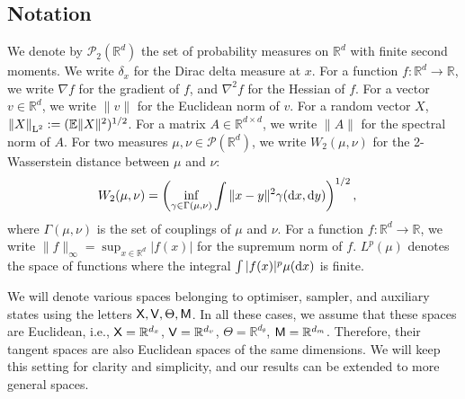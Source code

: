 \subsection{Notation}
We denote by $\mathcal{P}_2(\mathbb{R}^d)$ the set of probability measures on $\mathbb{R}^d$ with finite second moments.
We write $\delta_x$ for the Dirac delta measure at $x$. For a function $f:\mathbb{R}^d\rightarrow\mathbb{R}$, we write $\nabla f$ for the gradient of $f$, and $\nabla^2 f$ for the Hessian of $f$. For a vector $v\in\mathbb{R}^d$, we write $\|v\|$ for the Euclidean norm of $v$. For a random vector $X$, $\mathopen{\lVert}X\mathclose{\rVert}_{\mathrm{L}^2}:=(\mathbb{E}\|X\|^2)^{1/2}$. For a matrix $A\in\mathbb{R}^{d\times d}$, we write $\|A\|$ for the spectral norm of $A$. For two measures $\mu,\nu\in\mathcal{P}(\mathbb{R}^d)$, we write $W_2(\mu,\nu)$ for the 2-Wasserstein distance between $\mu$ and $\nu$:
\begin{align*}
    W_2(\mu,\nu) &= \left(\inf_{\gamma\in\Gamma(\mu,\nu)}\int \|x-y\|^2 \gamma(\mathrm{d} x,\mathrm{d} y)\right)^{1/2},
\end{align*}
where $\Gamma(\mu,\nu)$ is the set of couplings of $\mu$ and $\nu$. For a function $f:\mathbb{R}^d\rightarrow\mathbb{R}$, we write $\|f\|_\infty = \sup_{x\in\mathbb{R}^d}|f(x)|$ for the supremum norm of $f$. $L^p(\mu)$ denotes the space of functions where the integral $\int |f(x)|^p \mu(\mathrm{d} x)$ is finite.

We will denote various spaces belonging to optimiser, sampler, and auxiliary states using the letters ${\mathsf{X}}, {\mathsf{V}}, \Theta, {\mathsf{M}}$. In all these cases, we assume that these spaces are Euclidean, i.e., ${\mathsf{X}} = \mathbb{R}^{d_x}$, ${\mathsf{V}} = \mathbb{R}^{d_v}$, $\Theta = \mathbb{R}^{d_\theta}$, ${\mathsf{M}} = \mathbb{R}^{d_m}$. Therefore, their tangent spaces are also Euclidean spaces of the same dimensions. We will keep this setting for clarity and simplicity, and our results can be extended to more general spaces.